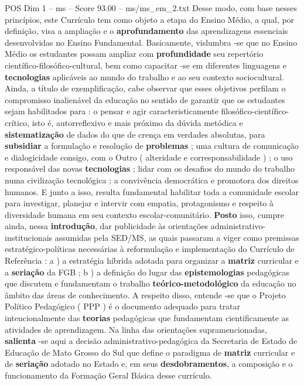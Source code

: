 \begin{textsample}{POS Dim 1 – ms – Score 93.00 – ms/ms\_em\_2.txt}
Desse modo, com base nesses princípios, este Currículo tem como objeto a etapa do Ensino Médio, a qual, por definição, visa a ampliação e o \textbf{aprofundamento} das aprendizagens essenciais desenvolvidas no Ensino Fundamental.
Basicamente, vislumbra -se que no Ensino Médio os estudantes possam ampliar com \textbf{profundidade} seu repertório científico-filosófico-cultural, bem como capacitar -se em diferentes linguagens e \textbf{tecnologias} aplicáveis ao mundo do trabalho e ao seu contexto sociocultural.
Ainda, a título de exemplificação, cabe observar que esses objetivos perfilam o compromisso inalienável da educação no sentido de garantir que os estudantes sejam habilitados para : o pensar e agir caracteristicamente filosófico-científico-crítico, isto é, autorreflexivo e mais próximo da dúvida metódica e \textbf{sistematização} de dados do que de crença em verdades absolutas, para \textbf{subsidiar} a formulação e resolução de \textbf{problemas} ; uma cultura de comunicação e dialogicidade consigo, com o Outro ( alteridade e corresponsabilidade ) ; o uso responsável das novas \textbf{tecnologias} ; lidar com os desafios do mundo do trabalho numa civilização tecnológica ; a convivência democrática e promotora dos direitos humanos.
E junto a isso, resulta fundamental habilitar toda a comunidade escolar para investigar, planejar e intervir com empatia, protagonismo e respeito à diversidade humana em seu contexto escolar-comunitário. \textbf{Posto} isso, cumpre ainda, nessa \textbf{introdução}, dar publicidade às orientações administrativo-institucionais assumidas pela SED/MS, as quais passaram a viger como premissas estratégico-políticas necessárias à reformulação e implementação do Currículo de Referência : a ) a estratégia híbrida adotada para organizar a \textbf{matriz} curricular e a \textbf{seriação} da FGB ; b ) a definição do lugar das \textbf{epistemologias} pedagógicas que discutem e fundamentam o trabalho \textbf{teórico-metodológico} da educação no âmbito das áreas de conhecimento.
A respeito disso, entende -se que o Projeto Político Pedagógico ( PPP ) é o documento adequado para tratar intencionalmente das \textbf{teorias} pedagógicas que fundamentam cientificamente as atividades de aprendizagem.
Na linha das orientações supramencionadas, \textbf{salienta} -se aqui a decisão administrativo-pedagógica da Secretaria de Estado de Educação de Mato Grosso do Sul que define o paradigma de \textbf{matriz} curricular e de \textbf{seriação} adotado no Estado e, em seus \textbf{desdobramentos}, a composição e o funcionamento da Formação Geral Básica desse currículo.

\end{textsample}
